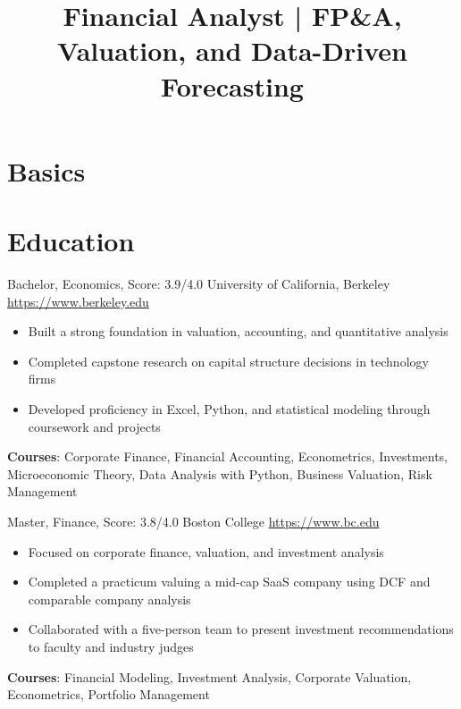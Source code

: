 \documentclass[a4paper, serif, 10pt]{moderncv}
\title{Financial Analyst | FP\&A, Valuation, and Data-Driven Forecasting}
\begin{document}
\maketitle

\section{Basics}

\section{Education}

        {Bachelor, Economics, Score: 3.9/4.0}
        {University of California, Berkeley}
        {\url{https://www.berkeley.edu}}
        {}
        {\begin{itemize}
\item Built a strong foundation in valuation, accounting, and quantitative analysis
\item Completed capstone research on capital structure decisions in technology firms
\item Developed proficiency in Excel, Python, and statistical modeling through coursework and projects
\end{itemize}
\textbf{Courses}: Corporate Finance, Financial Accounting, Econometrics, Investments, Microeconomic Theory, Data Analysis with Python, Business Valuation, Risk Management}

        {Master, Finance, Score: 3.8/4.0}
        {Boston College}
        {\url{https://www.bc.edu}}
        {}
        {\begin{itemize}
\item Focused on corporate finance, valuation, and investment analysis
\item Completed a practicum valuing a mid-cap SaaS company using DCF and comparable company analysis
\item Collaborated with a five-person team to present investment recommendations to faculty and industry judges
\end{itemize}
\textbf{Courses}: Financial Modeling, Investment Analysis, Corporate Valuation, Econometrics, Portfolio Management}
\end{document}
